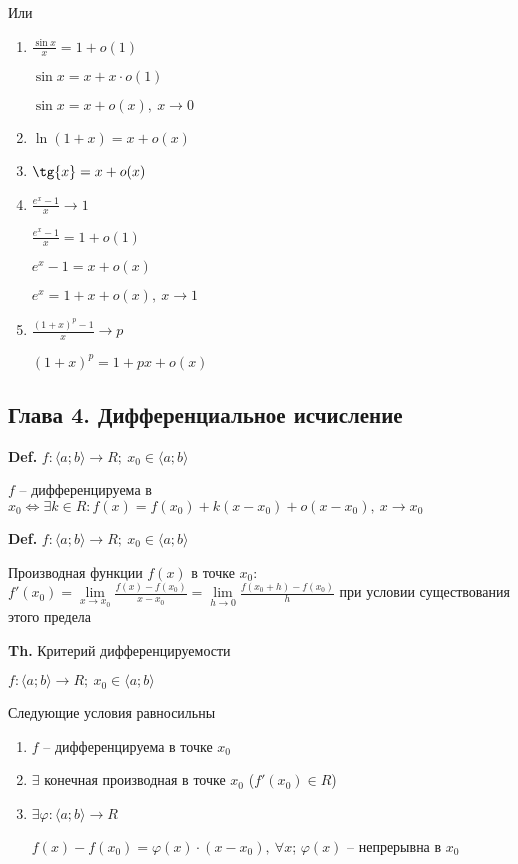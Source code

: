 \documentclass[14pt, letter paper]{article}
\newcommand{\q}[1]{\langle #1 \rangle}
\begin{document}
Или

\begin{enumerate}
    \item $\frac{\sin{x}}{x} = 1 + o(1)$

    $\sin{x} = x + x \cdot o(1)$

    $\sin{x} = x + o(x),\ x \rightarrow 0$

    \item $\ln{(1+x)} = x + o(x)$

    \item $\tg{x} = x + o(x)$

    \item $\frac{e^x -1}{x} \rightarrow 1$

    $\frac{e^x-1}{x} = 1 + o(1)$

    $e^x - 1 = x + o(x)$

    $e^x = 1 + x + o(x),\ x \rightarrow 1$

    \item $\frac{(1+x)^p-1}{x} \rightarrow p$

    $(1+x)^p = 1 + px + o(x)$
\end{enumerate}

\begin{center}
    \section*{Глава 4. Дифференциальное исчисление}
\end{center}

\textbf{Def.} $f : \q{a; b} \rightarrow R;\ x_0 \in \q{a; b}$

$f$ -- дифференцируема в $x_0 \Leftrightarrow \exists k \in R : f(x) = f(x_0) + k(x - x_0) + o(x - x_0),\ x \rightarrow x_0$

\textbf{Def.} $f : \q{a; b} \rightarrow R;\ x_0 \in \q{a; b}$

Производная функции $f(x)$ в точке $x_0$: $f'(x_0) = \lim\limits_{x \rightarrow x_0}{\frac{f(x) - f(x_0)}{x - x_0}} = \lim\limits_{h \rightarrow 0}{\frac{f(x_0 + h) - f(x_0)}{h}}$ при условии существования этого предела

\textbf{Th.} Критерий дифференцируемости

$f : \q{a; b} \rightarrow R;\ x_0 \in \q{a; b}$

Следующие условия равносильны

\begin{enumerate}
    \item $f$ -- дифференцируема в точке $x_0$

    \item $\exists$ конечная производная в точке $x_0$ ($f'(x_0) \in R$)

    \item $\exists \varphi : \q{a; b} \rightarrow R$

    $f(x) - f(x_0) = \varphi(x) \cdot (x - x_0),\ \forall x$; $\varphi(x)$ -- непрерывна в $x_0$
\end{enumerate}
\end{document}
